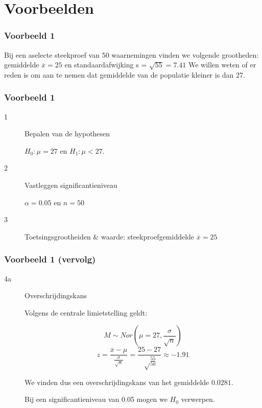 \documentclass[aspectratio=169]{beamer}
\begin{document}
\section{Voorbeelden}

\begin{frame}
  \frametitle{Voorbeeld 1}
  Bij een aselecte steekproef van 50 waarnemingen vinden we volgende grootheden: gemiddelde $\overline{x} = 25$ en standaardafwijking s = $\sqrt{55} = 7.41$
  We willen weten of er reden is om aan te nemen dat gemiddelde van de populatie kleiner is dan 27.
  
\end{frame}

\begin{frame}
  \frametitle{Voorbeeld 1}
  
  \begin{description}
    \item[1] Bepalen van de hypothesen
    
    $H_{0} : \mu = 27$ en $H_{1}: \mu < 27$.
    
    \item[2] Vastleggen significantieniveau
    
    $\alpha = 0.05$ en $n=50$
    
    \item[3] Toetsingsgrootheiden \& waarde: steekproefgemiddelde $\overline{x} = 25$
    
    
  \end{description}
\end{frame}

\begin{frame}
  \frametitle{Voorbeeld 1 (vervolg)}
  
  \begin{description}
    \item[4a] Overschrijdingskans
    
    Volgens de centrale limietstelling geldt:
    
    \[ M \sim Nor(\mu = 27, \frac{\sigma}{\sqrt{n}}) \]
    \[ z = \frac{\overline{x} - \mu}{\frac{\sigma}{\sqrt{n}}} = \frac{25-27}{\sqrt\frac{55}{50}} \approx -1.91\]
    
    We vinden dus een overschrijdingskans van het gemiddelde $0.0281$.
    
    
    Bij een significantieniveau van 0.05 mogen we $H_{0}$ verwerpen.
  \end{description}
  
\end{frame}
\end{document}
